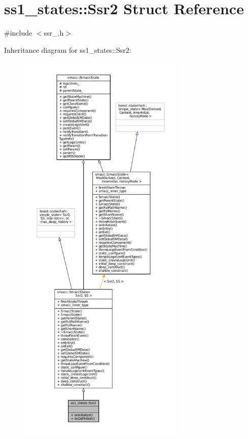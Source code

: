 \hypertarget{structss1__states_1_1Ssr2}{}\section{ss1\+\_\+states\+:\+:Ssr2 Struct Reference}
\label{structss1__states_1_1Ssr2}


{\ttfamily \#include $<$ssr\+\_.\+h$>$}



Inheritance diagram for ss1\+\_\+states\+:\+:Ssr2\+:
\nopagebreak
\begin{figure}[H]
\begin{center}
\leavevmode
\includegraphics[height=550pt]{structss1__states_1_1Ssr2__inherit__graph}
\end{center}
\end{figure}


